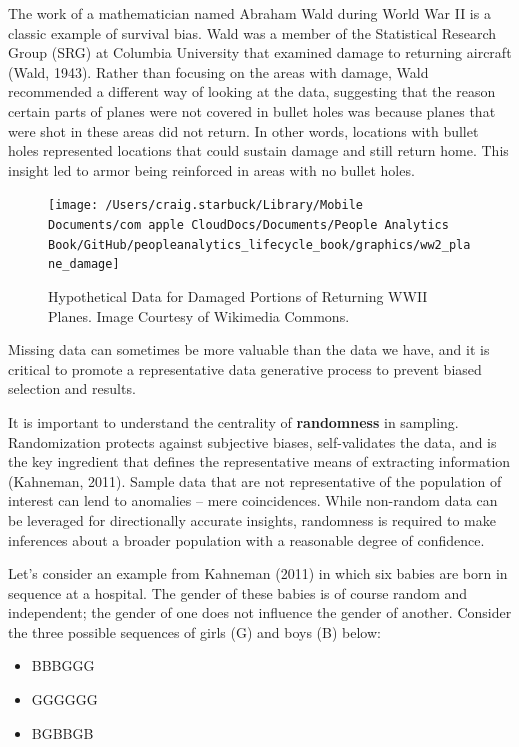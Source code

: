 \documentclass[
]{book}
\providecommand{\tightlist}{%
  \setlength{\itemsep}{0pt}\setlength{\parskip}{0pt}}
\begin{document}
The work of a mathematician named Abraham Wald during World War II is a classic example of survival bias. Wald was a member of the Statistical Research Group (SRG) at Columbia University that examined damage to returning aircraft (Wald, 1943). Rather than focusing on the areas with damage, Wald recommended a different way of looking at the data, suggesting that the reason certain parts of planes were not covered in bullet holes was because planes that were shot in these areas did not return. In other words, locations with bullet holes represented locations that could sustain damage and still return home. This insight led to armor being reinforced in areas with no bullet holes.

\begin{figure}

{\centering \texttt{[image: /Users/craig.starbuck/Library/Mobile Documents/com~apple~CloudDocs/Documents/People Analytics Book/GitHub/peopleanalytics\_lifecycle\_book/graphics/ww2\_plane\_damage]} 

}

\caption{Hypothetical Data for Damaged Portions of Returning WWII Planes. Image Courtesy of Wikimedia Commons.}\label{fig:ww2-plane-damage}
\end{figure}

Missing data can sometimes be more valuable than the data we have, and it is critical to promote a representative data generative process to prevent biased selection and results.

It is important to understand the centrality of \textbf{randomness} in sampling. Randomization protects against subjective biases, self-validates the data, and is the key ingredient that defines the representative means of extracting information (Kahneman, 2011). Sample data that are not representative of the population of interest can lend to anomalies -- mere coincidences. While non-random data can be leveraged for directionally accurate insights, randomness is required to make inferences about a broader population with a reasonable degree of confidence.

Let's consider an example from Kahneman (2011) in which six babies are born in sequence at a hospital. The gender of these babies is of course random and independent; the gender of one does not influence the gender of another. Consider the three possible sequences of girls (G) and boys (B) below:

\begin{itemize}
\tightlist
\item
  BBBGGG
\item
  GGGGGG
\item
  BGBBGB
\end{itemize}
\end{document}
